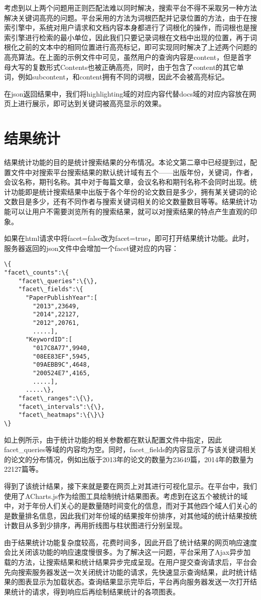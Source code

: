 考虑到以上两个问题用正则匹配法难以同时解决，搜索平台不得不采取另一种方法解决关键词高亮的问题。平台采用的方法为词根匹配并记录位置的方法，由于在搜索引擎中，系统对用户请求和文档内容本身都进行了词根化的操作，而词根也是搜索引擎进行检索的最小单位，因此我们只要记录词根在文档中出现的位置，再于词根化之前的文本中的相同位置进行高亮标记，即可实现同时解决了上述两个问题的高亮算法。在上面的示例文件中可见，虽然用户的查询内容是content，但是首字母大写的复数形式Contents也被正确高亮，同时，由于包含了content的其它单词，例如subcontent，和content拥有不同的词根，因此不会被高亮标记。

在json返回结果中，我们将highlighting域的对应内容代替docs域的对应内容放在网页上进行展示，即可达到关键词被高亮显示的效果。

\section{结果统计}
结果统计功能的目的是统计搜索结果的分布情况。本论文第二章中已经提到过，配置文件中对搜索平台搜索结果的默认统计域有五个——出版年份，关键词，作者，会议名称，期刊名称。其中对于每篇文章，会议名称和期刊名称不会同时出现。统计功能即是统计搜索结果中出版于各个年份的论文数目是多少，拥有某关键词的论文数目是多少，还有不同作者与搜索关键词相关的论文数量数目等等。结果统计功能可以让用户不需要浏览所有的搜索结果，就可以对搜索结果的特点产生直观的印象。

如果在html请求中将facet=false改为facet=true，即可打开结果统计功能。此时，服务器返回的json文件中会增加一个facet键对应的内容：

\begin{lstlisting}[caption={结果统计}, label=facet, escapeinside="", numbers=none]
\{
"facet\_counts":\{
    "facet\_queries":\{\},
    "facet\_fields":\{
      "PaperPublishYear":[
        "2013",23649,
        "2014",22127,
        "2012",20761,
        .....],
      "KeywordID":[
        "017C8A77",9940,
        "08EE83EF",5945,
        "09AEBB9C",4648,
        "200524E7",4165,
        .....],
      .....\},
    "facet\_ranges":\{\},
    "facet\_intervals":\{\},
    "facet\_heatmaps":\{\}\}
\}
\end{lstlisting}

如上例所示，由于统计功能的相关参数都在默认配置文件中指定，因此facet\_queries等域的内容均为空。同时，facet\_fields的内容显示了与该关键词相关的论文的分布情况，例如出版于2013年的论文的数量为23649篇，2014年的数量为22127篇等。

得到了该统计结果，接下来就是要在网页上对其进行可视化显示。在平台中，我们使用了ACharts.js作为绘图工具绘制统计结果图表。考虑到在这五个被统计的域中，对于年份人们关心的是数量随时间变化的信息，而对于其他四个域人们关心的是数量排名信息，因此我们对年份域的结果按年份排序，对其他域的统计结果按统计数目从多到少排序，再用折线图与柱状图进行分别呈现。

由于结果统计功能复杂度较高，花费时间多，因此开启了统计结果的网页响应速度会比关闭该功能的响应速度慢很多。为了解决这一问题，平台采用了Ajax异步加载的方法，让搜索结果和统计结果异步完成呈现。在用户提交查询请求后，平台会先向搜索服务器发送一次关闭统计功能的请求，先快速显示查询结果，此时统计结果的图表显示为加载状态。查询结果显示完毕后，平台再向服务器发送一次打开结果统计的请求，得到响应后再绘制结果统计的各项图表。